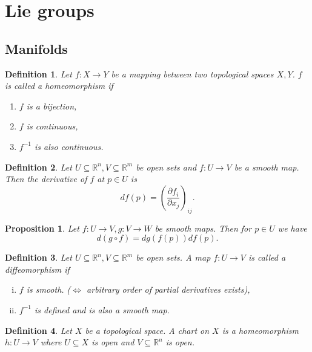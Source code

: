 \documentclass{article}
\newtheorem{proposition}{Proposition}[section]
\newtheorem{definition}{Definition}[section]
\numberwithin{equation}{section}
\begin{document}
\section{Lie groups}

\subsection{Manifolds}

\begin{definition}
Let $f:X\to Y$ be a mapping between two topological spaces $X,Y$. $f$ is called a homeomorphism if 
\begin{enumerate}
\item $f$ is a bijection,
\item $f$ is continuous,
\item $f^{-1}$ is also continuous.
\end{enumerate}
\end{definition}

\begin{definition}
Let $U\subseteq\mathbb{R}^n,V\subseteq\mathbb{R}^m$ be open sets and $f:U\to V$ be a smooth map. Then the derivative of $f$ at $p\in U$ is 
\begin{equation*}
df(p) = \left({\frac {\partial f_i} {\partial x_j}}\right)_{ij}.
\end{equation*}
\end{definition}

\begin{proposition}
Let $f:U\to V, g:V\to W$ be smooth maps. Then for $p\in U$ we have
\begin{equation*}
d(g\circ f) = dg(f(p))df(p).
\end{equation*}
\end{proposition}

\begin{definition}
Let $U\subseteq\mathbb{R}^n,V\subseteq\mathbb{R}^m$ be open sets. A map $f:U\to V$ is called a diffeomorphism if 
\begin{enumerate}[i).]
\item $f$ is smooth. ($\Leftrightarrow$ arbitrary order of partial derivatives exists),
\item $f^{-1}$ is defined and is also a smooth map.
\end{enumerate}
\end{definition}

\begin{definition}
Let $X$ be a topological space. A chart on $X$ is a homeomorphism $h:U\to V$ where $U\subseteq X$ is open and $V\subseteq \mathbb{R}^n$ is open.
\end{definition}
\end{document}
